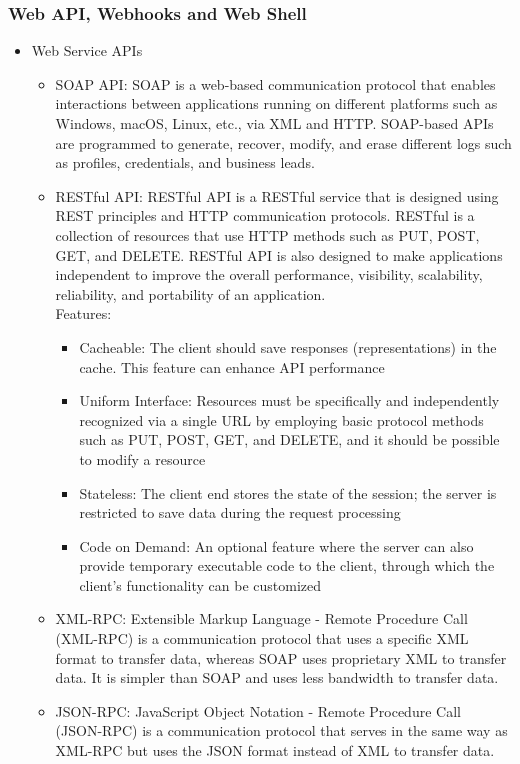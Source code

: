 \subsubsection{Web API, Webhooks and Web Shell}
\begin{itemize}
    \item Web Service APIs
    \begin{itemize}
        \item SOAP API: SOAP is a web-based communication protocol that enables interactions between applications running on different platforms such as Windows, macOS, Linux, etc., via XML and HTTP. SOAP-based APIs are programmed to generate, recover, modify, and erase different logs such as profiles, credentials, and business leads.
        \item RESTful API: RESTful API is a RESTful service that is designed using REST principles and HTTP communication protocols. RESTful is a collection of resources that use HTTP methods such as PUT, POST, GET, and DELETE. RESTful API is also designed to make applications independent to improve the overall performance, visibility, scalability, reliability, and portability of an application.\\
        Features:
        \begin{itemize}
            \item Cacheable: The client should save responses (representations) in the cache. This feature can enhance API performance
            \item Uniform Interface: Resources must be specifically and independently recognized via a single URL by employing basic protocol methods such as PUT, POST, GET, and DELETE, and it should be possible to modify a resource
            \item Stateless: The client end stores the state of the session; the server is restricted to save data during the request processing
            \item Code on Demand: An optional feature where the server can also provide temporary executable code to the client, through which the client's functionality can be customized
        \end{itemize}
        \item XML-RPC: Extensible Markup Language - Remote Procedure Call (XML-RPC) is a communication protocol that uses a specific XML format to transfer data, whereas SOAP uses proprietary XML to transfer data. It is simpler than SOAP and uses less bandwidth to transfer data.
        \item JSON-RPC: JavaScript Object Notation - Remote Procedure Call (JSON-RPC) is a communication protocol that serves in the same way as XML-RPC but uses the JSON format instead of XML to transfer data.

\end{itemize}
\end{itemize}
